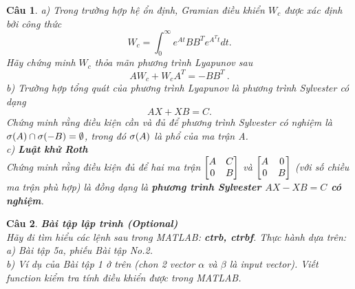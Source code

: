 \documentclass[11pt]{article}
\newtheorem{bt}{Câu}
\begin{document}
\begin{bt}
a) Trong trường hợp hệ ổn định, Gramian điều khiển $W_c$ được xác định bởi công thức
%
\[
W_c  = \int_0^{\infty} e^{At} BB^T e^{A^Tt} dt. 
\]
%
Hãy chứng minh $W_c$ thỏa mãn phương trình Lyapunov sau
%
\begin{equation}\label{lyap}
	A W_c + W_c A^T = - B B^T \ .
\end{equation}
%
b) Trường hợp tổng quát của phương trình Lyapunov là phương trình Sylvester có dạng
%
\begin{equation}\label{sylvester}
A X + X B = C.
\end{equation}
%
Chứng minh rằng điều kiện cần và đủ để phương trình Sylvester có nghiệm là 
$\sigma(A) \cap \sigma(-B) = \emptyset$, trong đó $\sigma(A)$ là phổ của ma trận A. \\
c) \textbf{Luật khử Roth} \\
Chứng minh rằng điều kiện đủ để hai ma trận $\begin{bmatrix} A & C\\0 & B \end{bmatrix}$ và $\begin{bmatrix} A & 0 \\ 0 & B \end{bmatrix}$ (với số chiều ma trận phù hợp) là đồng dạng là \textbf{phương trình Sylvester $AX - XB = C$ có nghiệm}.
\end{bt}

\begin{bt} \textbf{Bài tập lập trình (Optional)} \\
	Hãy đi tìm hiểu các lệnh sau trong MATLAB: \textbf{ctrb, ctrbf}. Thực hành dựa trên: \\
	a) Bài tập 5a, phiếu Bài tập No.2. \\
	b) Ví dụ của Bài tập 1 ở trên (chon 2 vector $\alpha$ và $\beta$ là input vector). Viết function kiểm tra tính điều khiển được trong MATLAB. 
\end{bt}   

	
\end{document}
